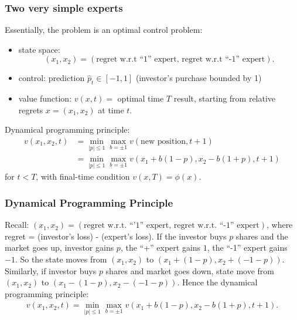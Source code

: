 \documentclass{beamer}
\begin{document}
\begin{frame}
\frametitle{Two very simple experts}
Essentially,  the problem is an optimal control problem:
\begin{itemize}
\pause
\item {\color{red}state space:}$$(x_1,x_2) = (\text{regret w.r.t ``1'' expert, regret w.r.t ``-1'' expert}).$$
\pause
\item {\color{red}control:} prediction $\hat{p}_t\in[-1,1]$ ({\color{blue}investor's purchase bounded by 1}) 
\pause
\item {\color{red}value function:} $v(x,t) = $ optimal time $T$ result, starting from relative regrets $x = (x_1,x_2)$ at time $t$. 
\end{itemize}

{\color{red}Dynamical programming principle:}
\begin{align*}
v(x_1,x_2,t) &= \min_{|p|\le 1}\max_{b = \pm 1}v(\text{new position},t+1)\\
                    & = \min_{|p|\le 1}\max_{b = \pm 1}v(x_1 + b(1-p),x_2-b(1+p),t+1)		
\end{align*}
for $t<T$, with final-time condition $v(x,T) = \phi(x).$

\end{frame}

\begin{frame}
\frametitle{Dynamical Programming Principle}
Recall: {\color{red}$(x_1,x_2) = (\text{regret w.r.t. ``'1'' expert, regret w.r.t. ``-1'' expert})$}, where regret  = (investor's loss) - (expert's loss).
\vfill
If the investor buys ${p}$ shares and the market goes up, investor gains ${p}$, the 
``+'' expert gains $1$, the ``-1'' expert gains $-1$. So the state moves from $(x_1,x_2)$ to $(x_1+(1-{p}),x_2+(-1-{p})).$
\vfill
Similarly, if investor buys ${p}$ shares  and market goes down, state move from $(x_1,x_2)$ to $(x_1-(1-{p}),x_2-(-1-{p})).$
\vfill
Hence the dynamical programming principle:
 \begin{align*}
 v(x_1,x_2,t) = \min_{|p|\le 1}\max_{b = \pm 1}v(x_1 + b(1-p),x_2-b(1+p),t+1).
 \end{align*}

\end{frame}
\end{document}
